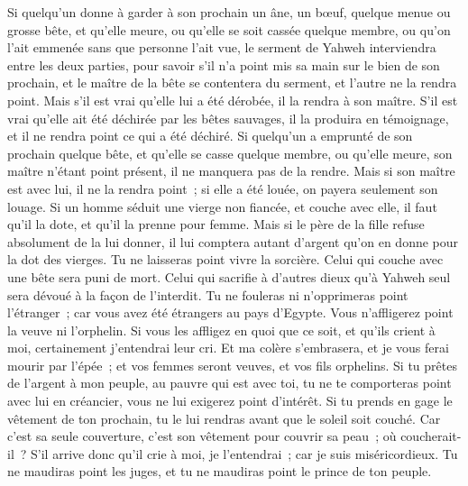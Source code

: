 \begin{multicols}{2}
Si quelqu'un donne à garder à son prochain un âne, un bœuf, quelque menue ou grosse bête, et qu'elle meure, ou qu'elle se soit cassée quelque membre, ou qu'on l'ait emmenée sans que personne l'ait vue,
le serment de Yahweh interviendra entre les deux parties, pour savoir s'il n'a point mis sa main sur le bien de son prochain, et le maître de la bête se contentera du serment, et l'autre ne la rendra point.
Mais s'il est vrai qu'elle lui a été dérobée, il la rendra à son maître.
S'il est vrai qu'elle ait été déchirée par les bêtes sauvages, il la produira en témoignage, et il ne rendra point ce qui a été déchiré.
Si quelqu'un a emprunté de son prochain quelque bête, et qu'elle se casse quelque membre, ou qu'elle meure, son maître n'étant point présent, il ne manquera pas de la rendre.
Mais si son maître est avec lui, il ne la rendra point~; si elle a été louée, on payera seulement son louage.
Si un homme séduit une vierge non fiancée, et couche avec elle, il faut qu'il la dote, et qu'il la prenne pour femme.
Mais si le père de la fille refuse absolument de la lui donner, il lui comptera autant d'argent qu'on en donne pour la dot des vierges.
Tu ne laisseras point vivre la sorcière.
Celui qui couche avec une bête sera puni de mort.
Celui qui sacrifie à d'autres dieux qu'à Yahweh seul sera dévoué à la façon de l'interdit.
Tu ne fouleras ni n'opprimeras point l'étranger~; car vous avez été étrangers au pays d'Egypte.
Vous n'affligerez point la veuve ni l'orphelin.
Si vous les affligez en quoi que ce soit, et qu'ils crient à moi, certainement j'entendrai leur cri.
Et ma colère s'embrasera, et je vous ferai mourir par l'épée~; et vos femmes seront veuves, et vos fils orphelins.
Si tu prêtes de l'argent à mon peuple, au pauvre qui est avec toi, tu ne te comporteras point avec lui en créancier, vous ne lui exigerez point d'intérêt.
Si tu prends en gage le vêtement de ton prochain, tu le lui rendras avant que le soleil soit couché.
Car c'est sa seule couverture, c'est son vêtement pour couvrir sa peau~; où coucherait-il~? S'il arrive donc qu'il crie à moi, je l'entendrai~; car je suis miséricordieux.
Tu ne maudiras point les juges, et tu ne maudiras point le prince de ton peuple.

\end{multicols}

